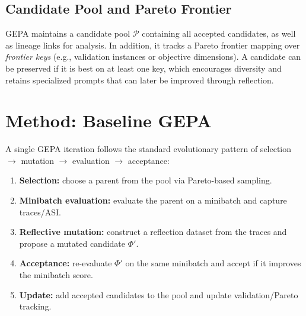 \subsection{Candidate Pool and Pareto Frontier}
GEPA maintains a candidate pool $\mathcal{P}$ containing all accepted candidates, as well as lineage links for analysis. In addition, it tracks a Pareto frontier mapping over \emph{frontier keys} (e.g., validation instances or objective dimensions). A candidate can be preserved if it is best on at least one key, which encourages diversity and retains specialized prompts that can later be improved through reflection. \citep{agrawal2025gepa,gepa_repo}

\section{Method: Baseline GEPA}
A single GEPA iteration follows the standard evolutionary pattern of selection $\rightarrow$ mutation $\rightarrow$ evaluation $\rightarrow$ acceptance:
\begin{enumerate}
    \item \textbf{Selection:} choose a parent from the pool via Pareto-based sampling.
    \item \textbf{Minibatch evaluation:} evaluate the parent on a minibatch and capture traces/ASI.
    \item \textbf{Reflective mutation:} construct a reflection dataset from the traces and propose a mutated candidate $\Phi'$.
    \item \textbf{Acceptance:} re-evaluate $\Phi'$ on the same minibatch and accept if it improves the minibatch score.
    \item \textbf{Update:} add accepted candidates to the pool and update validation/Pareto tracking.
\end{enumerate}


